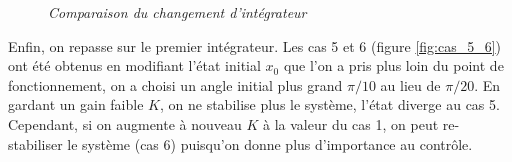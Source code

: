 \documentclass[11pt,french]{article} %
\begin{document}
\begin{figure}[H]%
    \centering
		\noindent{}%
		\caption{\textit{Comparaison du changement d'intégrateur}}%
		\label{fig:cas_3_4}%
\end{figure}
\vspace{0.5cm}

\quad Enfin, on repasse sur le premier intégrateur. Les cas 5 et 6 (figure \ref{fig:cas_5_6}) ont été obtenus en modifiant l'état initial $x_0$ que l'on a pris plus loin du point de fonctionnement, on a choisi un angle initial plus grand $\pi/10$ au lieu de $\pi/20$. En gardant un gain faible $K$, on ne stabilise plus le système, l'état diverge au cas 5. Cependant, si on augmente à nouveau $K$ à la valeur du cas 1, on peut re-stabiliser le système (cas 6) puisqu'on donne plus d'importance au contrôle. \\
\end{document}
